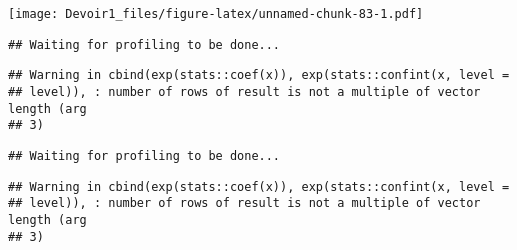 \documentclass[]{article}
\newenvironment{Shaded}{\begin{snugshade}}{\end{snugshade}}
\newcommand{\KeywordTok}[1]{\textcolor[rgb]{0.13,0.29,0.53}{\textbf{#1}}}
\newcommand{\DataTypeTok}[1]{\textcolor[rgb]{0.13,0.29,0.53}{#1}}
\newcommand{\DecValTok}[1]{\textcolor[rgb]{0.00,0.00,0.81}{#1}}
\newcommand{\StringTok}[1]{\textcolor[rgb]{0.31,0.60,0.02}{#1}}
\newcommand{\OperatorTok}[1]{\textcolor[rgb]{0.81,0.36,0.00}{\textbf{#1}}}
\newcommand{\NormalTok}[1]{#1}
\begin{document}
\texttt{[image: Devoir1\_files/figure-latex/unnamed-chunk-83-1.pdf]}

\begin{Shaded}
\end{Shaded}

\begin{verbatim}
## Waiting for profiling to be done...
\end{verbatim}

\begin{verbatim}
## Warning in cbind(exp(stats::coef(x)), exp(stats::confint(x, level =
## level)), : number of rows of result is not a multiple of vector length (arg
## 3)
\end{verbatim}

\begin{verbatim}
## Waiting for profiling to be done...
\end{verbatim}

\begin{verbatim}
## Warning in cbind(exp(stats::coef(x)), exp(stats::confint(x, level =
## level)), : number of rows of result is not a multiple of vector length (arg
## 3)
\end{verbatim}
\end{document}
